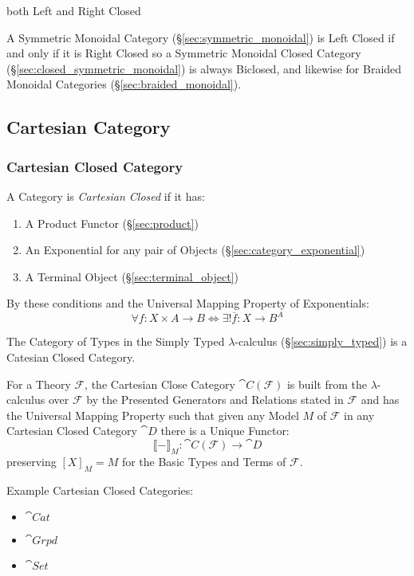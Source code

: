 both Left and Right Closed

A Symmetric Monoidal Category (\S\ref{sec:symmetric_monoidal}) is Left
Closed if and only if it is Right Closed so a Symmetric Monoidal
Closed Category (\S\ref{sec:closed_symmetric_monoidal}) is always
Biclosed, and likewise for Braided Monoidal Categories
(\S\ref{sec:braided_monoidal}).



\subsection{Cartesian Category}\label{sec:cartesian_category}

\subsubsection{Cartesian Closed Category}\label{sec:cartesian_closed}

A Category is \emph{Cartesian Closed} if it has:
\begin{enumerate}
  \item A Product Functor (\S\ref{sec:product})
  \item An Exponential for any pair of Objects
    (\S\ref{sec:category_exponential})
  \item A Terminal Object (\S\ref{sec:terminal_object})
\end{enumerate}
By these conditions and the Universal Mapping Property of
Exponentials:
\[
  \forall f : X \times A \rightarrow B \Leftrightarrow
  \exists ! \overline{f} : X \rightarrow B^A
\]

The Category of Types in the Simply Typed $\lambda$-calculus
(\S\ref{sec:simply_typed}) is a Catesian Closed Category.

For a Theory $\mathcal{F}$, the Cartesian Close Category
$\cat{C}(\mathcal{F})$ is built from the $\lambda$-calculus over
$\mathcal{F}$ by the Presented Generators and Relations stated in
$\mathcal{F}$ and has the Universal Mapping Property such that given
any Model $M$ of $\mathcal{F}$ in any Cartesian Closed Category
$\cat{D}$ there is a Unique Functor:
\[
  \llbracket - \rrbracket_M :
    \cat{C}(\mathcal{F}) \rightarrow \cat{D}
\]
preserving $[X]_M = M$ for the Basic Types and Terms of $\mathcal{F}$.
\cite{awodey06}

Example Cartesian Closed Categories:
\begin{itemize}
\item $\cat{Cat}$
\item $\cat{Grpd}$
\item $\cat{Set}$
\end{itemize}

